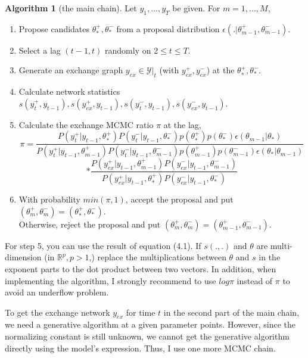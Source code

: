 \documentclass[a4paper, 11pt]{report}
\theoremstyle{definition}
\newtheorem{algo}{Algorithm}[section]
\begin{document}
\clearpage
\begin{algo}[the main chain]
Let $y_1,...,y_T$ be given. For $m=1,...,M$,
\begin{enumerate}
    \item Propose candidates $\theta_*^+,\theta_*^-$ from a proposal distribution $\epsilon(.|\theta_{m-1}^+,\theta_{m-1}^-)$.
    \item Select a lag $(t-1,t)$ randomly on $2 \leq t \leq T$.
    \item Generate an exchange graph $y_{ex} \in\mathcal{Y}|_t$ (with $y_{ex}^+, y_{ex}^-$) at the $\theta_*^+,\theta_*^-$.
    \item Calculate network statistics $s(y_t^+,y_{t-1}), s(y_{ex}^+,y_{t-1}), s(y_t^-,y_{t-1}), s(y_{ex}^-,y_{t-1})$.
    \item Calculate the exchange MCMC ratio $\pi$ at the lag,
        \[\pi = \frac{P(y_t^+|y_{t-1},\theta_*^+)P(y_t^-|y_{t-1},\theta_*^-)p(\theta_*^+)p(\theta_*^-)\epsilon(\theta_{m-1}|\theta_*)}
            {P(y_t^+|y_{t-1},\theta_{m-1}^+)P(y_t^-|y_{t-1},\theta_{m-1}^-)p(\theta_{m-1}^+)p(\theta_{m-1}^-)\epsilon(\theta_*|\theta_{m-1})} \]
        \[* \frac{P(y_{ex}^+|y_{t-1},\theta_{m-1}^+)P(y_{ex}^-|y_{t-1},\theta_{m-1}^-)}{P(y_{ex}^+|y_{t-1},\theta_*^+)P(y_{ex}^-|y_{t-1},\theta_*^-)}\]
    \item With probability $min(\pi,1)$, accept the proposal and put $(\theta_m^+,\theta_m^-) = (\theta_*^+,\theta_*^-)$.\\
        Otherwise, reject the proposal and put $(\theta_m^+,\theta_m^-) = (\theta_{m-1}^+,\theta_{m-1}^-)$.
\end{enumerate}
\end{algo}    

For step 5, you can use the result of equation (4.1). If $s(.,.)$ and $\theta$ are multi-dimension (in $\mathbb{R}^p, p>1$,) 
replace the multiplications between $\theta$ and $s$ in the exponent parts to the dot product between two vectors.
In addition, when implementing the algorithm, I strongly recommend to use $log\pi$ instead of $\pi$ to avoid an underflow problem.

To get the exchange network $y_{ex}$ for time $t$ in the second part of the main chain, 
we need a generative algorithm at a given parameter points. 
However, since the normalizing constant is still unknown, 
we cannot get the generative algorithm directly using the model's expression. 
Thus, I use one more MCMC chain.
\end{document}
